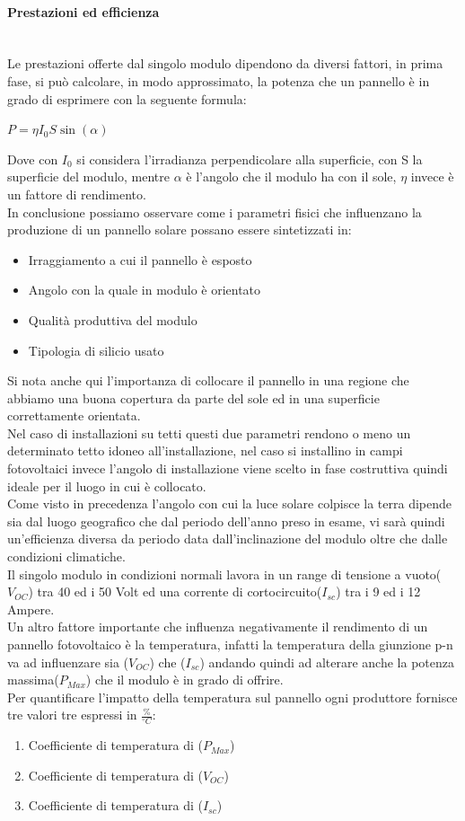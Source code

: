 \paragraph{Prestazioni ed efficienza}\mbox{}\\
Le prestazioni offerte dal singolo modulo dipendono da diversi fattori, in prima fase, si può calcolare, in modo approssimato, la potenza che un pannello è in grado di esprimere con la seguente formula:
\begin{center}
    \large{$P = \eta I_0 S \sin(\alpha)  $}
\end{center}
Dove con $I_0$ si considera l'irradianza perpendicolare alla superficie, con S la superficie del modulo, mentre $\alpha$ è l'angolo che il modulo ha con il sole, $\eta$ invece è un fattore di rendimento.\\
In conclusione possiamo osservare come i parametri fisici che influenzano la produzione di un pannello solare possano essere sintetizzati in:
\begin{itemize}
    \item Irraggiamento a cui il pannello è esposto
    \item Angolo con la quale in modulo è orientato
    \item Qualità produttiva del modulo
    \item Tipologia di silicio usato
\end{itemize}
Si nota anche qui l'importanza di collocare il pannello in una regione che abbiamo una buona copertura da parte del sole ed in una superficie correttamente orientata.\\
Nel caso di installazioni su tetti questi due parametri rendono o meno un determinato tetto idoneo all'installazione, nel caso si installino in campi fotovoltaici invece l'angolo di installazione viene scelto in fase costruttiva quindi ideale per il luogo in cui è collocato.\\
Come visto in precedenza l'angolo con cui la luce solare colpisce la terra dipende sia dal luogo geografico che dal periodo dell'anno preso in esame, vi sarà quindi un'efficienza diversa da periodo data dall'inclinazione del modulo oltre che dalle condizioni climatiche.\\
Il singolo modulo in condizioni normali lavora in un range di tensione a vuoto($V_{OC}$) tra 40 ed i 50 Volt ed una corrente di cortocircuito($I_{sc}$) tra i 9 ed i 12 Ampere.\\
Un altro fattore importante che influenza negativamente il rendimento di un pannello fotovoltaico è la temperatura, infatti la temperatura della giunzione p-n va ad influenzare sia ($V_{OC}$) che ($I_{sc}$) andando quindi ad alterare anche la potenza massima($P_{Max}$) che il modulo è in grado di offrire.\\
Per quantificare l'impatto della temperatura sul pannello ogni produttore fornisce tre valori tre espressi in $\frac{\%}{^\circ C}$:
\begin{enumerate}
    \item Coefficiente di temperatura di ($P_{Max}$)
    \item Coefficiente di temperatura di ($V_{OC}$)
    \item Coefficiente di temperatura di ($I_{sc}$)
\end{enumerate}
\newpage
